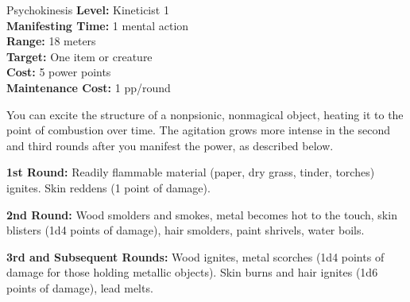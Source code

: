 {Psychokinesis}
{
	\textbf{Level:}
	Kineticist 1\\
	\textbf{Manifesting Time:}
	1 mental action\\
	\textbf{Range:}
	18 meters\\
	\textbf{Target:}
	One item or creature\\
	\textbf{Cost:}
	5 power points\\
	\textbf{Maintenance Cost:}
	1 pp/round\\
}
{
	You can excite the structure of a nonpsionic, nonmagical object, heating it to the point of combustion over time. The agitation grows more intense in the second and third rounds after you manifest the power, as described below.

	\textbf{1st Round:} Readily flammable material (paper, dry grass, tinder, torches) ignites. Skin reddens (1 point of damage).

	\textbf{2nd Round:} Wood smolders and smokes, metal becomes hot to the touch, skin blisters (1d4 points of damage), hair smolders, paint shrivels, water boils.

	\textbf{3rd and Subsequent Rounds:} Wood ignites, metal scorches (1d4 points of damage for those holding metallic objects). Skin burns and hair ignites (1d6 points of damage), lead melts.
}
